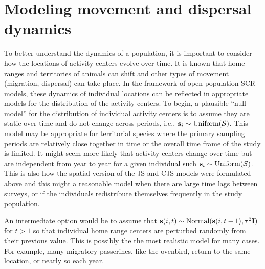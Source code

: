 \section{Modeling movement and dispersal dynamics}
\label{open.sec.ACdyanmics}

To better understand the dynamics of a population, it is important to
consider how the locations of activity centers evolve over time. It is
known that home ranges and territories of animals can shift and other
types of movement (migration, dispersal) can take place. In the
framework of open population SCR models, these dynamics of individual
locations can be reflected in appropriate models for the distribution
of the activity centers.  To begin, a plausible ``null model'' for the
distribution of individual activity centers is to assume they are
static over time and do not change across periods, i.e., ${\bf s}_{i}
\sim \mbox{Uniform}({\cal S})$.  This model may be appropriate for
territorial species where the primary sampling periods are relatively
close together in time or the overall time frame of the study is
limited.  It might seem more likely that activity centers change over
time but are independent from year to year for a given individual such
${\bf s}_{i} \sim \mbox{Uniform}({\cal S})$.  This is also how the
spatial version of the JS and CJS models were formulated above and
this might a reasonable model when there are large time lags between
surveys, or if the individuals redistribute themselves frequently in
the study population.

An intermediate option would be to assume that ${\bf s}(i,t) \sim
\mbox{Normal}({\bf s}(i,t-1), \tau^{2} {\bf I})$ for $t > 1$ so that
individual home range centers are perturbed randomly from their
previous value.  This is possibly the the most realistic model for
many cases.  For example, many migratory passerines, like the
ovenbird, return to the same location, or nearly so each year.


